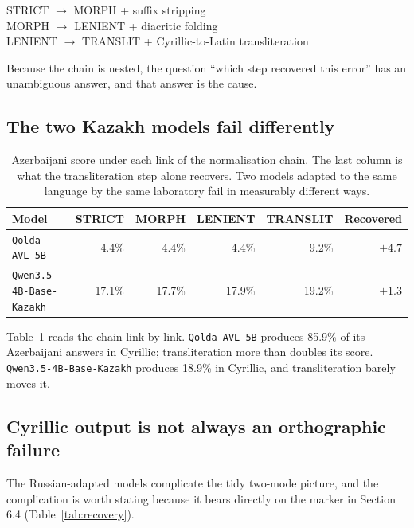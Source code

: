 \documentclass[final]{clv2025}
\begin{document}
\begin{displaytext}
STRICT $\rightarrow$ MORPH \quad + suffix stripping\\
MORPH $\rightarrow$ LENIENT \quad + diacritic folding\\
LENIENT $\rightarrow$ TRANSLIT \quad + Cyrillic-to-Latin transliteration
\end{displaytext}

Because the chain is nested, the question ``which step recovered this error''
has an unambiguous answer, and that answer is the cause.

\subsection{The two Kazakh models fail differently}

\begin{table}[h!]
\caption{Azerbaijani score under each link of the normalisation chain. The last
column is what the transliteration step alone recovers. Two models adapted to
the same language by the same laboratory fail in measurably different ways.}
\label{tab:chains}
\centering
\small
\begin{tabular}{lrrrrr}
\toprule
Model & STRICT & MORPH & LENIENT & TRANSLIT & Recovered \\
\midrule
\texttt{Qolda-AVL-5B} & 4.4\% & 4.4\% & 4.4\% & 9.2\% & $\mathbf{+4.7}$ \\
\texttt{Qwen3.5-4B-Base-Kazakh} & 17.1\% & 17.7\% & 17.9\% & 19.2\% & $+1.3$ \\
\bottomrule
\end{tabular}
\end{table}

Table~\ref{tab:chains} reads the chain link by link.
\texttt{Qolda-AVL-5B} produces 85.9\% of its Azerbaijani answers in Cyrillic;
transliteration more than doubles its score.
\texttt{Qwen3.5-4B-Base-Kazakh} produces 18.9\% in Cyrillic, and
transliteration barely moves it.

\subsection{Cyrillic output is not always an orthographic failure}

The Russian-adapted models complicate the tidy two-mode picture, and the
complication is worth stating because it bears directly on the marker in
Section 6.4 (Table~\ref{tab:recovery}).
\end{document}
